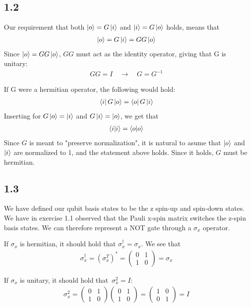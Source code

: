 \documentclass[12p,a4paper]{article}
\newcommand{\0}{\ket{0}}
\newcommand{\1}{\ket{1}}
\begin{document}
\subsection*{1.2}
Our requirement that both $\ket{o} = G\ket{i}$ and $\ket{i} = G\ket{o}$ holds, means that
\begin{align*}
    \ket{o} = G\ket{i} = GG\ket{o}
\end{align*}
Since $\ket{o} = GG\ket{o}$, $GG$ must act as the identity operator, giving that G is unitary:
\begin{align*}
    GG = I \quad \rightarrow \quad G = G^{-1}
\end{align*}

If G were a hermitian operator, the following would hold:
\begin{align*}
    \bra{i}G\ket{o} = \bra{o}G\ket{i}
\end{align*}
Inserting for $G\ket{o} = \ket{i}$ and $G\ket{i} = \ket{o}$, we get that
\begin{align*}
    \bra{i}\ket{i} = \bra{o}\ket{o}
\end{align*}
Since $G$ is meant to "preserve normalization", it is natural to asume that $\ket{o}$ and $\ket{i}$ are normalized to 1, and the statement above holds. Since it holds, $G$ must be hermitian.



\subsection*{1.3}
We have defined our qubit basis states to be the z spin-up and spin-down states. We have in exercise 1.1 observed that the Pauli x-spin matrix switches the z-spin basis states. We can therefore represent a NOT gate through a $\sigma_x$ operator.

If $\sigma_x$ is hermitian, it should hold that $\sigma_x^\dag = \sigma_x$. We see that
\begin{align*}
    \sigma_x^\dag = (\sigma_x^T)^* = \begin{pmatrix} 0 & 1 \\ 1 & 0 \end{pmatrix} = \sigma_x
\end{align*}

If $\sigma_x$ is unitary, it should hold that $\sigma_x^2 = I$:
\begin{align*}
    \sigma_x^2 = \begin{pmatrix} 0 & 1 \\ 1 & 0 \end{pmatrix} \begin{pmatrix} 0 & 1 \\ 1 & 0 \end{pmatrix} = \begin{pmatrix} 1 & 0 \\ 0 & 1 \end{pmatrix} = I
\end{align*}
\end{document}
